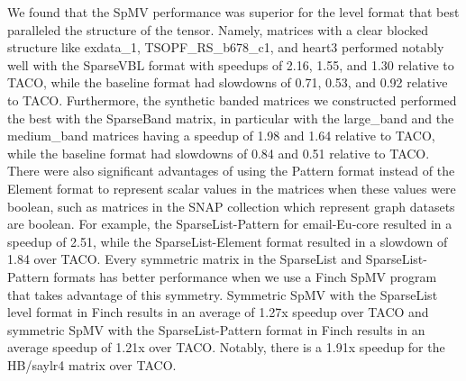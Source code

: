   We found that the SpMV performance was superior for the level format that best paralleled the structure of the tensor.
  Namely, matrices with a clear blocked structure like exdata\_1, TSOPF\_RS\_b678\_c1, and heart3 performed notably well with the SparseVBL format with speedups of 2.16, 1.55, and 1.30 relative to TACO, while the baseline format had slowdowns of 0.71, 0.53, and 0.92 relative to TACO. Furthermore, the synthetic banded matrices we constructed performed the best with the SparseBand matrix, in particular with the large\_band and the medium\_band matrices having a speedup of 1.98 and 1.64 relative to TACO, while the baseline format had slowdowns of 0.84 and 0.51 relative to TACO.
  There were also significant advantages of using the Pattern format instead of the Element format to represent scalar values in the matrices when these values were boolean, such as matrices in the SNAP collection which represent graph datasets are boolean. For example, the SparseList-Pattern for email-Eu-core resulted in a speedup of 2.51, while the SparseList-Element format resulted in a slowdown of 1.84 over TACO.
  Every symmetric matrix in the SparseList and SparseList-Pattern formats has better performance when we use a Finch SpMV program that takes advantage of this symmetry.
  Symmetric SpMV with the SparseList level format in Finch results in an average of 1.27x speedup over TACO and symmetric SpMV with the SparseList-Pattern format in Finch results in an average speedup of 1.21x over TACO.
  Notably, there is a 1.91x speedup for the HB/saylr4 matrix over TACO. 
  
  
  
  
  
  
